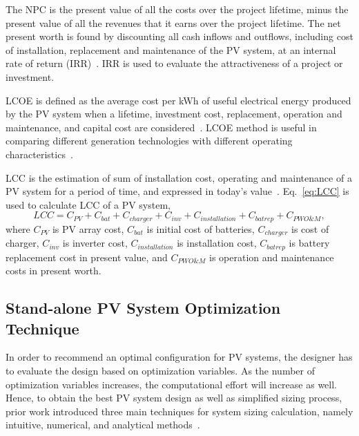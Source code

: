 \documentclass[review]{elsarticle}
\begin{document}
The NPC is the present value of all the costs over the project lifetime, minus the present value of all the revenues that it earns over the project lifetime. The net present worth is found by discounting all cash inflows and outflows, including cost of installation, replacement and maintenance of the PV system, at an internal rate of return (IRR)~\cite{Park2004}. IRR is used to evaluate the attractiveness of a project or investment.

LCOE is defined as the average cost per kWh of useful electrical energy produced by the PV system when a lifetime, investment cost, replacement, operation and maintenance, and capital cost are considered~\cite{Kamel2005}. LCOE method is useful in comparing different generation technologies with different operating characteristics~\cite{Zhou2010}.

LCC is the estimation of sum of installation cost, operating and maintenance of a PV system for a period of time, and expressed in today's value~\cite{Applasamy2011}. Eq.~\eqref{eq:LCC} is used to calculate LCC of a PV system,
%
\begin{equation}
\label{eq:LCC}
LCC = C_{PV} + C_{bat} + C_{charger} + C_{inv} + C_{installation} + C_{batrep} + C_{PWO\&M},
\end{equation}
\noindent where $C_{PV}$ is PV array cost, $C_{bat}$ is initial cost of batteries, $C_{charger}$ is cost of charger, $C_{inv}$ is inverter cost, $C_{installation}$ is installation cost, $C_{batrep}$ is battery replacement cost in present value, and $C_{PWO\&M}$ is operation and maintenance costs 
in present worth.

\subsection{Stand-alone PV System Optimization Technique}

In order to recommend an optimal configuration for PV systems, 
the designer has to evaluate the design based on optimization variables. 
As the number of optimization variables increases, the computational effort 
will increase as well. Hence, to obtain the best PV system design as well as 
simplified sizing process, prior work introduced three main techniques 
for system sizing calculation, namely intuitive, numerical, and analytical methods~\cite{Zhou2010}.
\end{document}
